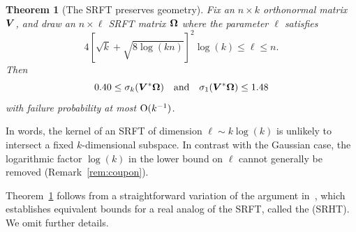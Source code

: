 \documentclass{article}
\newtheorem{theorem}{Theorem}
\begin{document}


\lsp

\begin{theorem}[The SRFT preserves geometry] \label{thm:SRFT-spec-bd}
Fix an $n \times k$ orthonormal matrix $\bm{V}$, and
draw an $n \times \ell$ SRFT matrix $\bm{\Omega}$
where the parameter $\ell$
satisfies
$$
4 \left[ \sqrt{k} + \sqrt{8\log(kn)} \right]^{2} \log(k) \leq \ell \leq n.
$$
Then
$$
0.40 \leq \sigma_{k}(\bm{V}^* \bm{\Omega})
\quad\text{and}\quad
\sigma_{1}(\bm{V}^* \bm{\Omega}) \leq 1.48
$$
with failure probability at most $\mathrm{O}(k^{-1})$.
\end{theorem}





\lsp

In words, the kernel of an SRFT of dimension $\ell \sim k \log(k)$ is unlikely to intersect a fixed $k$-dimensional subspace. In contrast
with the Gaussian case, the logarithmic factor $\log(k)$ in the lower
bound on $\ell$ cannot generally be removed (Remark~\ref{rem:coupon}).

Theorem~\ref{thm:SRFT-spec-bd} follows from a straightforward variation of the argument in~\cite{Tro10:Improved-Analysis}, which establishes equivalent bounds for a real analog of the SRFT, called the  (SRHT).  We omit further details.



\end{document}
